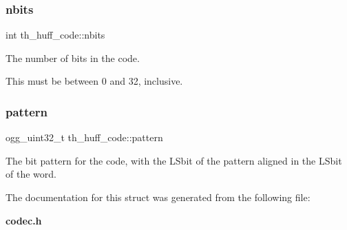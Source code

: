 \subsubsection{nbits}
{\footnotesize\ttfamily int th\+\_\+huff\+\_\+code\+::nbits}



The number of bits in the code. 

This must be between 0 and 32, inclusive. \mbox{\label{structth__huff__code_a6dd29e3aa5a0c5a2dd5ce1f45b1162b4}} 
\subsubsection{pattern}
{\footnotesize\ttfamily ogg\+\_\+uint32\+\_\+t th\+\_\+huff\+\_\+code\+::pattern}



The bit pattern for the code, with the L\+Sbit of the pattern aligned in the L\+Sbit of the word. 



The documentation for this struct was generated from the following file\+:\begin{DoxyCompactItemize}
\item 
\textbf{ codec.\+h}\end{DoxyCompactItemize}
